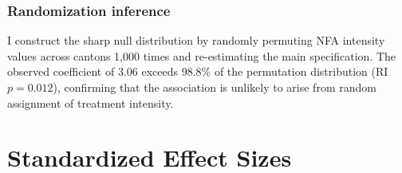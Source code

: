 \documentclass[12pt]{article}
\begin{document}
\subsubsection*{Randomization inference} I construct the sharp null distribution by randomly permuting NFA intensity values across cantons 1,000 times and re-estimating the main specification. The observed coefficient of 3.06 exceeds 98.8\% of the permutation distribution (RI $p = 0.012$), confirming that the association is unlikely to arise from random assignment of treatment intensity.

\section{Standardized Effect Sizes}
\label{sec:sde}


\end{document}
